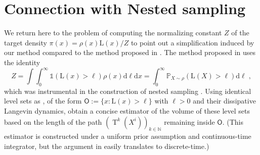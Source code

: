 \documentclass{article}
\def\transfo{\operatorname{T}}
\def\rmd{\operatorname{d}\hspace{-2pt}}
\def\rmd{\mathrm{d}}
\def\eqsp{\,}
\def\eqsp{\;}
\newcommand{\1}{\mathds{1}}
\def\const{Z}
\def\mso{\mathsf{O}}
\def\rmd{\mathrm{d}}
\def\likelihood{\mathrm{L}}
\begin{document}
\section{Connection with Nested sampling}


We return here to the problem of computing the normalizing constant $\const$ of the target density $\pi(x) =\rho(x)\likelihood(x)/\const$ to point out a simplification induced by our method compared to the method proposed in \cite{rotskoff:vanden-eijden:2019}.
The method proposed in \cite{rotskoff:vanden-eijden:2019} uses the identity
\begin{equation}\label{eq:nesting}    \const=\int \int_{0}^{\infty}\1(\likelihood(x)> \ell)\rho(x) \rmd \ell \rmd x =\int_0^\infty \mathbb{P}_{X\sim\rho}(\likelihood(X)> \ell) \rmd \ell\eqsp,
\end{equation}
which was instrumental in the construction of nested sampling
\cite{skilling2006nested,chopin:robert:2010}. Using identical level sets as \cite{skilling2006nested}, of the form $\mso:=\{x:\likelihood(x)>\ell\}$ with $\ell>0$ and their dissipative Langevin dynamics, \cite[Equation 13]{rotskoff:vanden-eijden:2019} obtain a concise estimator of the volume of these level sets based on the length of the path $(\transfo^k(X^i))_{k\in\mathbb N}$ remaining inside $\mso$. (This estimator is constructed under a uniform prior assumption and continuous-time integrator, but the argument in \cite{rotskoff:vanden-eijden:2019} easily translates to discrete-time.)
\end{document}
